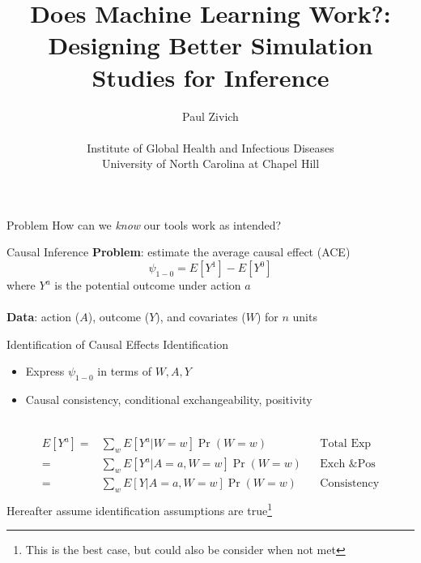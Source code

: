 \documentclass{beamer}
\title[Does Machine Learning Work?]{Does Machine Learning Work?: Designing Better Simulation Studies for Inference}
\author[Zivich]{Paul Zivich \\~\\ Institute of Global Health and Infectious Diseases \\ University of North Carolina at Chapel Hill}
\begin{document}
	
\begin{frame}[plain]
	\centering
	\maketitle
\end{frame}

\begin{frame}{Problem}
	\centering
	\Large
	How can we \textit{know} our tools work as intended?
\end{frame}

\begin{frame}{Causal Inference}
	\textbf{Problem}: estimate the average causal effect (ACE)~\\
	\[\psi_{1-0} = E[Y^1] - E[Y^0]\]
	where $Y^a$ is the potential outcome under action $a$\\~\\
	\textbf{Data}: action ($A$), outcome ($Y$), and covariates ($W$) for $n$ units
\end{frame}

\begin{frame}{Identification of Causal Effects}
	Identification
	\begin{itemize}
		\item Express $\psi_{1-0}$ in terms of $W,A,Y$
		\item Causal consistency, conditional exchangeability, positivity
	\end{itemize}{\small ~\\}
	\begin{equation*}
		\begin{aligned}
			E[Y^a] = & \sum_{w} E[Y^a | W=w] \Pr(W=w) && \text{Total Exp} \\
			 = & \sum_{w} E[Y^a | A=a, W=w] \Pr(W=w)  && \text{Exch \& Pos}\\ 
			 = & \sum_{w} E[Y | A=a, W=w] \Pr(W=w)  && \text{Consistency}\\ 
		\end{aligned}
	\end{equation*}
	Hereafter assume identification assumptions are true\footnote[frame]{This is the best case, but could also be consider when not met}	
\end{frame}
\end{document}

